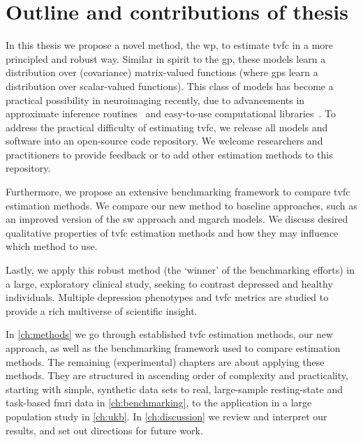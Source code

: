 \clearpage
\section{Outline and contributions of thesis}

In this thesis we propose a novel method, the \gls{wp}, to estimate \gls{tvfc} in a more principled and robust way.
Similar in spirit to the \gls{gp}, these models learn a distribution over (covariance) matrix-valued functions (where \glspl{gp} learn a distribution over scalar-valued functions).
This class of models has become a practical possibility in neuroimaging recently, due to advancements in approximate inference routines~\parencite{Heaukulani2019} and easy-to-use computational libraries~\parencite{Matthews2017}.
To address the practical difficulty of estimating \gls{tvfc}, we release all models and software into an open-source code repository.
We welcome researchers and practitioners to provide feedback or to add other estimation methods to this repository.

Furthermore, we propose an extensive benchmarking framework to compare \gls{tvfc} estimation methods.
We compare our new method to baseline approaches, such as an improved version of the \gls{sw} approach and \gls{mgarch} models.
We discuss desired qualitative properties of \gls{tvfc} estimation methods and how they may influence which method to use.

Lastly, we apply this robust method (the `winner' of the benchmarking efforts) in a large, exploratory clinical study, seeking to contrast depressed and healthy individuals.
Multiple depression phenotypes and \gls{tvfc} metrics are studied to provide a rich multiverse of scientific insight.

In \cref{ch:methods} we go through established \gls{tvfc} estimation methods, our new approach, as well as the benchmarking framework used to compare estimation methods.
The remaining (experimental) chapters are about applying these methods.
They are structured in ascending order of complexity and practicality, starting with simple, synthetic data sets to real, large-sample resting-state and task-based \gls{fmri} data in \cref{ch:benchmarking}, to the application in a large population study in \cref{ch:ukb}.
In \cref{ch:discussion} we review and interpret our results, and set out directions for future work.

